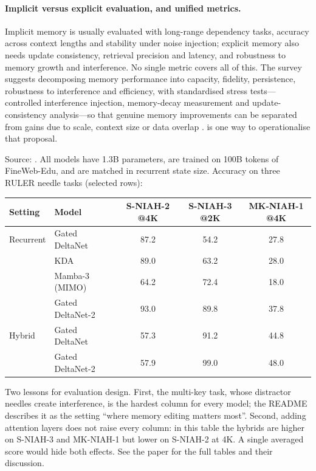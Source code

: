 \paragraph{Implicit versus explicit evaluation, and unified metrics.} Implicit memory is usually
evaluated with long-range dependency tasks, accuracy across context lengths and stability under
noise injection; explicit memory also needs update consistency, retrieval precision and latency, and
robustness to memory growth and interference. No single metric covers all of this. The survey
suggests decomposing memory performance into capacity, fidelity, persistence, robustness to
interference and efficiency, with standardised stress tests---controlled interference injection,
memory-decay measurement and update-consistency analysis---so that genuine memory improvements can
be separated from gains due to scale, context size or data overlap \citep[\S VI-F]{zhoubian2026memory}.
 is one way to operationalise that proposal.

\begin{results}[title={Reported results: RULER profiles of recurrent memories (Gated DeltaNet-2 README)}]
Source: . All models have 1.3B parameters, are
trained on 100B tokens of FineWeb-Edu, and are matched in recurrent state size. Accuracy on three
RULER needle tasks (selected rows):
\begin{center}\small
\begin{tabular}{@{}llccc@{}}
\toprule
Setting & Model & S-NIAH-2 @4K & S-NIAH-3 @2K & MK-NIAH-1 @4K \\
\midrule
Recurrent & Gated DeltaNet & 87.2 & 54.2 & 27.8 \\
          & KDA & 89.0 & 63.2 & 28.0 \\
          & Mamba-3 (MIMO) & 64.2 & 72.4 & 18.0 \\
          & Gated DeltaNet-2 & 93.0 & 89.8 & 37.8 \\
\midrule
Hybrid    & Gated DeltaNet & 57.3 & 91.2 & 44.8 \\
          & Gated DeltaNet-2 & 57.9 & 99.0 & 48.0 \\
\bottomrule
\end{tabular}
\end{center}
Two lessons for evaluation design. First, the multi-key task, whose distractor needles create
interference, is the hardest column for every model; the README describes it as the setting
``where memory editing matters most''. Second, adding attention layers does not raise every column:
in this table the hybrids are higher on S-NIAH-3 and MK-NIAH-1 but lower on S-NIAH-2 at 4K. A
single averaged score would hide both effects. See the paper for the full tables and their
discussion.
\end{results}

